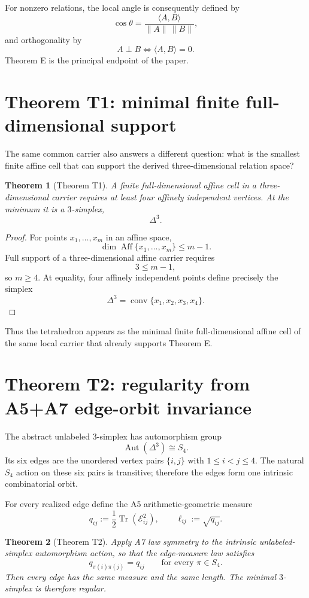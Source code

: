 \documentclass[12pt,a4paper]{article}
\newtheorem{theorem}{Theorem}[section]
\newcommand{\Aff}{\operatorname{Aff}}
\newcommand{\Tr}{\operatorname{Tr}}
\newcommand{\Aut}{\operatorname{Aut}}
\newcommand{\Erel}{\mathcal{E}}
\begin{document}
For nonzero relations, the local angle is consequently defined by
\[
\boxed{
\cos\theta=\frac{\langle A,B\rangle}{\|A\|\,\|B\|},
}
\]
and orthogonality by
\[
A\perp B\iff\langle A,B\rangle=0.
\]
Theorem E is the principal endpoint of the paper.

\section{Theorem T1: minimal finite full-dimensional support}

The same common carrier also answers a different question: what is the smallest finite affine cell that can support the derived three-dimensional relation space?

\begin{theorem}[Theorem T1]\label{thm:simplex}
A finite full-dimensional affine cell in a three-dimensional carrier requires at least four affinely independent vertices. At the minimum it is a $3$-simplex,
\[
\boxed{\Delta^3.}
\]
\end{theorem}

\begin{proof}
For points $x_1,\ldots,x_m$ in an affine space,
\[
\dim\Aff\{x_1,\ldots,x_m\}\le m-1.
\]
Full support of a three-dimensional affine carrier requires
\[
3\le m-1,
\]
so $m\ge4$. At equality, four affinely independent points define precisely the simplex
\[
\Delta^3=\operatorname{conv}\{x_1,x_2,x_3,x_4\}.
\]
\end{proof}

Thus the tetrahedron appears as the minimal finite full-dimensional affine cell of the same local carrier that already supports Theorem E.

\section{Theorem T2: regularity from A5+A7 edge-orbit invariance}

The abstract unlabeled $3$-simplex has automorphism group
\[
\boxed{\Aut(\Delta^3)\cong S_4.}
\]
Its six edges are the unordered vertex pairs $\{i,j\}$ with $1\le i<j\le4$. The natural $S_4$ action on these six pairs is transitive; therefore the edges form one intrinsic combinatorial orbit.

For every realized edge define the A5 arithmetic-geometric measure
\[
\boxed{
q_{ij}:=\frac12\Tr(\Erel_{ij}^2),\qquad
\ell_{ij}:=\sqrt{q_{ij}}.
}
\]

\begin{theorem}[Theorem T2]\label{thm:regular}
Apply A7 law symmetry to the intrinsic unlabeled-simplex automorphism action, so that the edge-measure law satisfies
\[
q_{\pi(i)\pi(j)}=q_{ij}
\qquad\text{for every }\pi\in S_4.
\]
Then every edge has the same measure and the same length. The minimal $3$-simplex is therefore regular.
\end{theorem}
\end{document}

